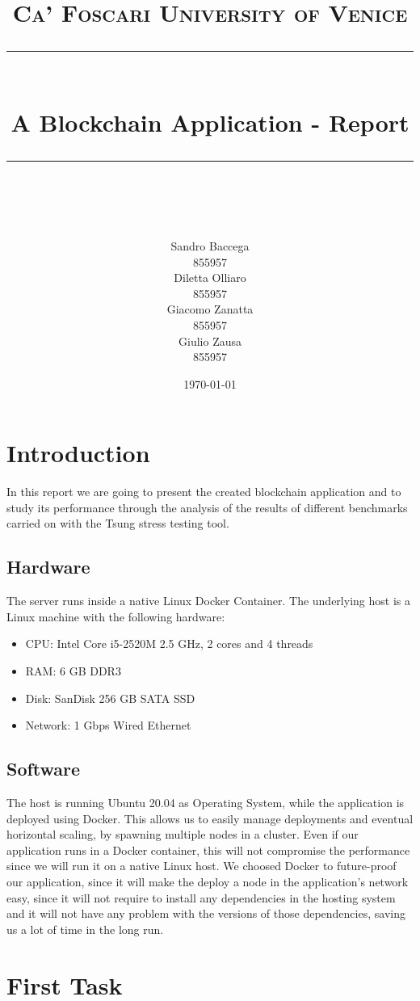 \documentclass[11pt]{scrartcl} %
\title{	
	\normalfont\normalsize
	\textsc{Ca' Foscari University of Venice}\\ %
	\vspace{25pt} %
	\rule{\linewidth}{0.5pt}\\ %
	\vspace{20pt} %
	{\huge A Blockchain Application - Report}\\ %
	\vspace{12pt} %
	\rule{\linewidth}{2pt}\\ %
	\vspace{12pt} %
}
\author{\hspace{-0.8cm} \parbox{4cm}{\centering
  Sandro Baccega\\ 855957} \parbox{4cm}{\centering
  Diletta Olliaro\\ 855957} \parbox{4cm}{\centering
  Giacomo Zanatta\\ 855957} \parbox{4cm}{\centering Giulio Zausa\\ 855957} } %
\date{\vspace{20pt}\today} %
\begin{document}
\maketitle %



\section{Introduction}

In this report we are going to present the created blockchain application and to study its performance through the analysis of the results of different benchmarks carried on with the Tsung stress testing tool.

\subsection{Hardware}
The server runs inside a native Linux Docker Container. The underlying host is a Linux machine with the following hardware:
\begin{itemize}
\item[\adforn{43}] CPU: Intel Core i5-2520M 2.5 GHz, 2 cores and 4 threads
\item[\adforn{43}] RAM: 6 GB DDR3
\item[\adforn{43}] Disk: SanDisk 256 GB SATA SSD
\item[\adforn{43}] Network: 1 Gbps Wired Ethernet
\end{itemize}

\subsection{Software}

The host is running Ubuntu 20.04 as Operating System, while the application is deployed using Docker. 
This allows us to easily manage deployments and eventual horizontal scaling, by spawning multiple nodes in a cluster. 
Even if our application runs in a Docker container, this will not compromise the performance since we will run it on a native Linux host. 
We choosed Docker to future-proof our application, since it will make the deploy a node in the application's network easy, since it will not require to install any dependencies in the hosting system and it will not have any problem with the versions of those dependencies, saving us a lot of time in the long run.

\section{First Task}
\end{document}
